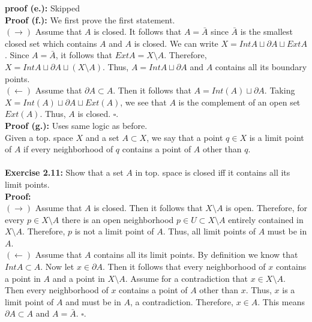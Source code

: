 \documentclass{article}
\begin{document}
\textbf{proof (e.):} Skipped\\
\textbf{Proof (f.):} We first prove the first statement.\\
$(\to)$ Assume that $A$ is closed. It follows that $A=\bar{A}$ since $\bar{A}$ is the smallest closed set which contains $A$ and $A$ is closed. We can write $X=IntA\sqcup \partial A \sqcup Ext A$. Since $A=\bar{A}$, it follows that $ExtA=X\setminus A$. Therefore, $X=Int A\sqcup \partial A \sqcup (X\setminus A)$. Thus, $A=IntA\sqcup \partial A$ and $A$ contains all its boundary points.\\
$(\leftarrow)$ Assume that $\partial A\subset A$. Then it follows that $A=Int(A)\sqcup \partial A$. Taking $X=Int(A)\sqcup\partial A\sqcup Ext(A)$, we see that $A$ is the complement of an open set $Ext(A)$. Thus, $A$ is closed. $\square$.
\\
\textbf{Proof (g.):} Uses same logic as before.\\

Given a top. space $X$ and a set $A\subset X$, we say that a point $q\in X$ is a limit point of $A$ if every neighborhood of $q$ contains a point of $A$ other than $q$.\\
\\
\textbf{Exercise 2.11:} Show that a set $A$ in top. space is closed iff it contains all its limit points.\\
\textbf{Proof:}\\
$(\to)$ Assume that $A$ is closed. Then it follows that $X\setminus A$ is open. Therefore, for every $p\in X\setminus A$ there is an open neighborhood $p\in U\subset X\setminus A$ entirely contained in $X\setminus A$. Therefore, $p$ is not a limit point of $A$. Thus, all limit points of $A$ must be in $A$.\\
$(\leftarrow)$ Assume that $A$ contains all its limit points. By definition we know that $IntA\subset A$. Now let $x\in \partial A$. Then it follows that every neighborhood of $x$ contains a point in $A$ and a point in $X\setminus A$. Assume for a contradiction that $x\in X\setminus A$. Then every neighborhood of $x$ contains a point of $A$ other than $x$. Thus, $x$ is a limit point of $A$ and must be in $A$, a contradiction. Therefore, $x\in A$. This means $\partial A\subset A$ and $A=\bar{A}$. $\square$.\\
\end{document}
